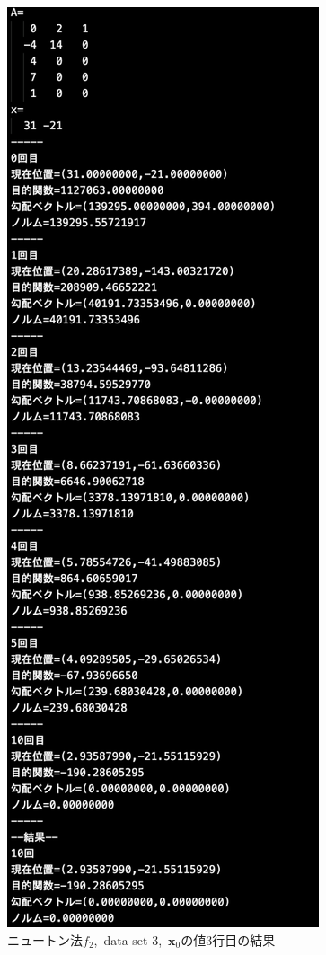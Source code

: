 \documentclass[12pt]{jarticle}
\begin{document}
\clearpage
\begin{figure}[h]
    \begin{center}
        \includegraphics[scale=0.3]{kadai1_2n_out3_3_1.png}
    \end{center}
    \caption{ニュートン法$f_2$,\ data set 3,\ $\boldsymbol{x}_0$の値3行目の結果}
\end{figure}
\end{document}
